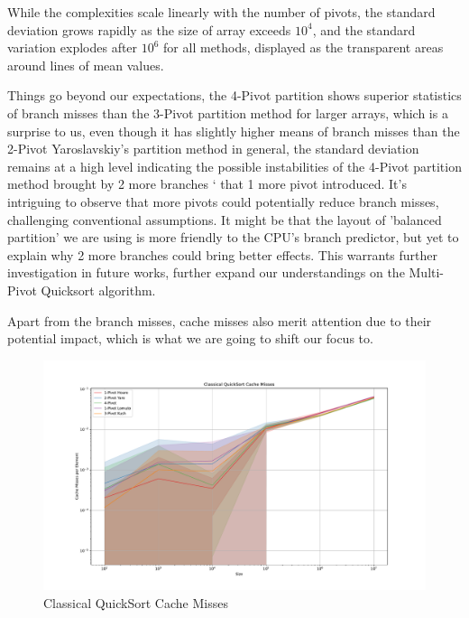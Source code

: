 \documentclass{article}
\begin{document}
While the complexities scale linearly with the number of pivots, the standard deviation grows rapidly as the size of array exceeds $10^4$, and the standard variation explodes after $10^6$ for all methods, displayed as the transparent areas around lines of mean values.

Things go beyond our expectations, the 4-Pivot partition shows superior statistics of branch misses than the 3-Pivot partition method for larger arrays, which is a surprise to us,
even though it has slightly higher means of branch misses than the 2-Pivot Yaroslavskiy's partition method in general, the standard deviation remains at a high level indicating
the possible instabilities of the 4-Pivot partition method brought by 2 more branches \hypertarget{2MoreBranches}{`} that 1 more pivot introduced. It's intriguing to observe that more pivots could potentially reduce branch misses, challenging conventional assumptions.
It might be that the layout of 'balanced partition' we are using is more friendly to the CPU's branch predictor, but yet to explain why 2 more branches could bring better effects. This warrants further investigation in future works, further expand our understandings on the Multi-Pivot Quicksort algorithm. 

Apart from the branch misses, cache misses also merit attention due to their potential impact, which is what we are going to shift our focus to.

\begin{figure}[H]
    \hypertarget{fig:classicalcachemiss}{}
    \caption{Classical QuickSort Cache Misses}
    \centering
    \hspace*{-0.27\textwidth}
    \includegraphics[width=1.5\textwidth]{Classical QuickSort Cache Misses.pdf}
\end{figure}
\end{document}
